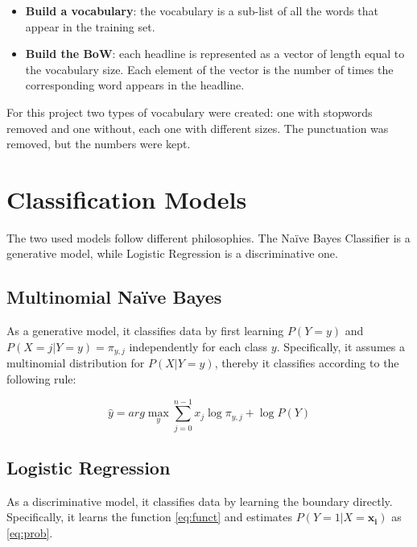 \documentclass{article}
\begin{document}
\begin{multicols}{2}
\vspace{-0.20cm}
\begin{itemize}[leftmargin=9pt]
\item \textbf{Build a vocabulary}: the vocabulary is a sub-list of all the words that appear in the training set.\vspace{-0.1cm}
\item \textbf{Build the BoW}: each headline is represented as a vector of length equal to the vocabulary size. Each element of the vector is the 
number of times the corresponding word appears in the headline.
\end{itemize}\vspace{-0.25cm}

For this project two types of vocabulary were created: one with stopwords removed and one without, each one with different sizes.
The punctuation was removed, but the numbers were kept.


\section{Classification Models}
The two used models follow different philosophies. The Naïve Bayes Classifier is a generative model, while Logistic Regression is a discriminative one.

\subsection{Multinomial Naïve Bayes}
As a generative model, it classifies data by first learning $P(Y=y)$ and $P(X=j|Y=y) = \pi_{y,j}$ independently for each class $y$. Specifically, it assumes
a multinomial distribution for $P(X|Y=y)$, thereby it classifies according to the following rule: 

\vspace{-0.2cm}
\begin{equation}
    \hat{y} = arg\max_y \sum_{j=0}^{n-1} x_j \log{\pi_{y,j}} + \log{P(Y)} 
\end{equation}
\vspace{-0.5cm}

\subsection{Logistic Regression}
As a discriminative model, it classifies data by learning the boundary directly. Specifically, it learns the function \ref{eq:funct} and estimates 
$P(Y=1|X=\mathbf{x_i})$ as \ref{eq:prob}. 


\end{multicols}
\end{document}
